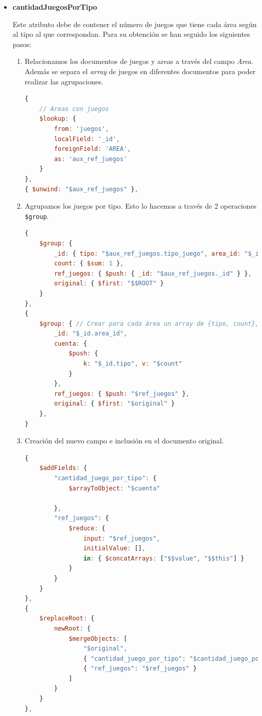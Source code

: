 \documentclass[]{article}
\begin{document}
\begin{itemize}
\begin{enumerate}
    \end{enumerate}

    \item \textbf{cantidadJuegosPorTipo}
    
    Este atributo debe de contener el número de juegos que tiene cada área según al tipo al que correspondan. Para su obtención se han seguido los siguientes pasos: 
    \begin{enumerate}
        \item Relacionamos los documentos de juegos y areas a través del campo \textit{Area}. Además se separa el \textit{array} de juegos en diferentes documentos para poder realizar las agrupaciones.
\begin{lstlisting}[caption=Relación de juegos y áreas, language=JavaScript]
{
    // Areas con juegos
    $lookup: {
        from: 'juegos',
        localField: '_id',
        foreignField: 'AREA',
        as: 'aux_ref_juegos'
    }
},
{ $unwind: "$aux_ref_juegos" }, 

\end{lstlisting}
        \item Agrupamos los juegos por tipo. Esto lo hacemos a través de 2 operaciones \texttt{\$group}.
\begin{lstlisting}[caption=Agrupacion de juegos por tipo, language=JavaScript]
{
    $group: {
        _id: { tipo: "$aux_ref_juegos.tipo_juego", area_id: "$_id" }, // agrupar areas y tipos
        count: { $sum: 1 },
        ref_juegos: { $push: { _id: "$aux_ref_juegos._id" } },
        original: { $first: "$$ROOT" }
    }
},
{
    $group: { // Crear para cada área un array de {tipo, count}, {tipo, count}
        _id: "$_id.area_id",
        cuenta: {
            $push: {
                k: "$_id.tipo", v: "$count"
            }
        },
        ref_juegos: { $push: "$ref_juegos" },
        original: { $first: "$original" }
    },
}
\end{lstlisting}
        \item Creación del nuevo campo e inclusión en el documento original.

\begin{lstlisting}[caption=Creación de nuevo campo en el documento original, language=JavaScript]
{
    $addFields: {
        "cantidad_juego_por_tipo": {
            $arrayToObject: "$cuenta"

        },
        "ref_juegos": {
            $reduce: {
                input: "$ref_juegos",
                initialValue: [],
                in: { $concatArrays: ["$$value", "$$this"] }
            }
        }
    }
},
{
    $replaceRoot: {
        newRoot: {
            $mergeObjects: [
                "$original",
                { "cantidad_juego_por_tipo": "$cantidad_juego_por_tipo" },
                { "ref_juegos": "$ref_juegos" }
            ]
        }
    }
},


\end{lstlisting}
\end{enumerate}
\end{itemize}
\end{document}
